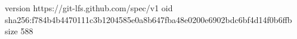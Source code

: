 version https://git-lfs.github.com/spec/v1
oid sha256:f784b4b4470111c3b1204585e0a8b647fba48e0200e6902bdc6bf4d14f0b6ffb
size 588
